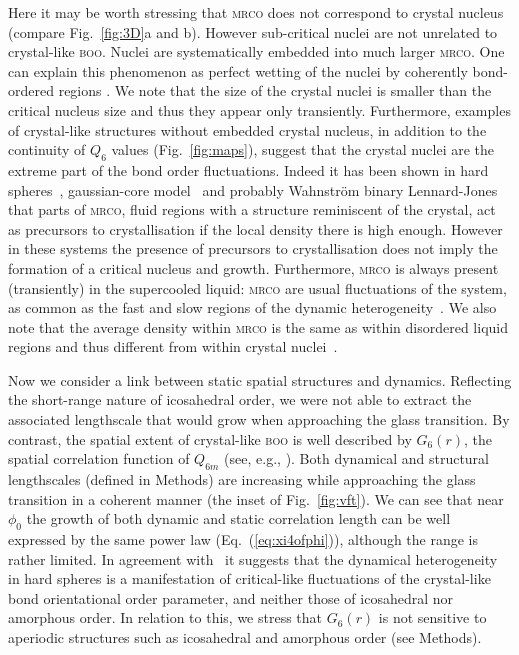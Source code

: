 Here it may be worth stressing that \textsc{mrco} does not correspond to crystal nucleus (compare Fig.~\ref{fig:3D}a and b). However sub-critical nuclei are not unrelated to crystal-like \textsc{boo}. Nuclei are systematically embedded into much larger \textsc{mrco}. One can explain this phenomenon as perfect wetting of the nuclei by coherently bond-ordered regions \cite{Kawasaki2010c}. 
We note that the size of the crystal nuclei is smaller than the critical nucleus size and thus they appear only transiently. 
Furthermore, examples of crystal-like structures without embedded crystal nucleus, in addition to the continuity of $Q_6$ values (Fig.~\ref{fig:maps}), suggest that the crystal nuclei are the extreme part of the bond order fluctuations. 
Indeed it has been shown in hard spheres~\cite{OMalley2005, Schilling2010, Kawasaki2010c}, gaussian-core model~\cite{Russo2012} and probably Wahnstr\"om binary Lennard-Jones~\cite{Pedersen2010} that parts of \textsc{mrco}, fluid regions with a structure reminiscent of the crystal, act as precursors to crystallisation if the local density there is high enough. However in these systems the presence of precursors to crystallisation does not imply the formation of a critical nucleus and growth. Furthermore, \textsc{mrco} is always present (transiently) in the supercooled liquid: \textsc{mrco} are usual fluctuations of the system, as common as the fast and slow regions of the dynamic heterogeneity~\cite{tanaka2010critical}. We also note that the average density within \textsc{mrco} is the same as within disordered liquid regions and thus different from within crystal nuclei~\cite{Kawasaki2010c}.

Now we consider a link between static spatial structures and dynamics. 
Reflecting the short-range nature of icosahedral order, we were not able to extract the associated lengthscale that would grow when approaching the glass transition. By contrast, the spatial extent of crystal-like \textsc{boo} is well described by $G_6(r)$, the spatial correlation function of $Q_{6 m}$ (see, e.g., \cite{tanaka2010critical}). Both dynamical and structural lengthscales (defined in Methods) are increasing while approaching the glass transition in a coherent manner (the inset of Fig.~\ref{fig:vft}). We can see that near $\phi_0$ the growth of both dynamic and static correlation length can be well expressed by the same power law (Eq.~(\ref{eq:xi4ofphi})), although the range is rather limited. In agreement with~\citep{tanaka2010critical} it suggests that the dynamical heterogeneity in hard spheres is a manifestation of critical-like fluctuations of the crystal-like bond orientational order parameter, and neither those of icosahedral nor amorphous order. In relation to this, we stress that $G_6(r)$ is not sensitive to aperiodic structures such as icosahedral and amorphous order (see Methods). 

